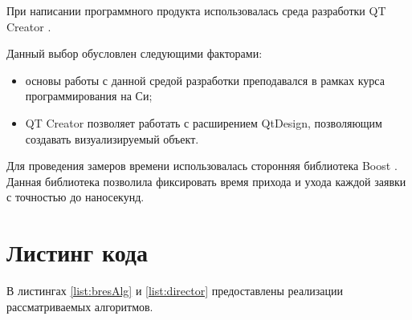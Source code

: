 \documentclass[12pt]{report}
\begin{document}
При написании программного продукта использовалась среда разработки QT Creator \cite{QT}.

Данный выбор обусловлен следующими факторами:
\begin{itemize}
\item основы работы с данной средой разработки преподавался в рамках курса программирования на Си;
\item QT Creator позволяет работать с расширением QtDesign, позволяющим создавать визуализируемый объект.
\end{itemize}

Для проведения замеров времени использовалась сторонняя библиотека Boost \cite{Boost}. Данная библиотека позволила фиксировать время прихода и ухода каждой заявки с точностью до наносекунд.

\section{Листинг кода}
В листингах \ref{list:bresAlg} и \ref{list:director} предоставлены реализации рассматриваемых алгоритмов.
\end{document}
